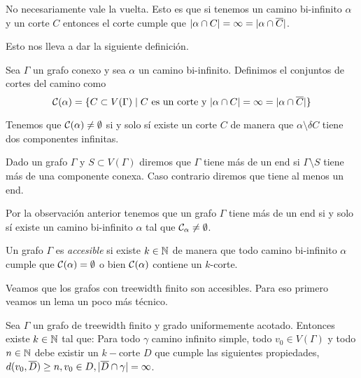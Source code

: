 \documentclass[tesis.tex]{subfiles}
\begin{document}
No necesariamente vale la vuelta.
Esto es que si tenemos un camino bi-infinito $\alpha$ y un corte $C$ entonces el corte cumple que $|\alpha \cap C| = \infty = |\alpha \cap \overline C|$.

Esto nos lleva a dar la siguiente definición.

\begin{deff}
	Sea $\Gamma$ un grafo conexo y sea $\alpha$ un camino bi-infinito.
	Definimos el conjuntos de cortes del camino como 
	\[
		{\cal C}(\alpha) = \{ C \subset V(\Gamma) \mid  C \ \text{es un corte y} \ |\alpha \cap C| = \infty = |\alpha \cap \overline C| \}
	\] 
\end{deff}

\begin{obs}
Tenemos que ${\cal C}(\alpha) \neq \emptyset$ si y solo sí existe un corte $C$ de manera que $\alpha \setminus \delta C$ tiene dos componentes infinitas.
\end{obs}
	
\begin{deff}
	Dado un grafo $\Gamma$ y $S \subset V(\Gamma)$ diremos que $\Gamma$ tiene más de un end si $\Gamma \setminus S$ tiene más de una componente conexa.
	Caso contrario diremos que tiene al menos un end.
\end{deff}

\begin{obs}
	Por la observación anterior tenemos que un grafo $\Gamma$ tiene más de un end si y solo sí existe un camino bi-infinito $\alpha$ tal que ${\cal C}_{\alpha} \neq \emptyset$.
\end{obs}


\begin{deff}
	Un grafo $\Gamma$ es \emph{accesible} si existe $k \in \mathbb{N}$ de manera que todo camino bi-infinito $\alpha$ cumple que ${\cal C}(\alpha) = \emptyset$ o bien ${\cal C}(\alpha)$ contiene un $k$-corte.
\end{deff}

Veamos que los grafos con treewidth finito son accesibles.
Para eso primero veamos un lema un poco más técnico.

\begin{lema}\label{lema_corte_treewidth}
	Sea $\Gamma$ un grafo de treewidth finito y grado uniformemente acotado.
	Entonces existe $k \in \mathbb{N}$ tal que:
	Para todo $\gamma$ camino infinito simple, todo $v_0 \in V(\Gamma)$ y todo $n \in \mathbb{N}$ debe existir un $k-$corte $D$ que cumple las siguientes propiedades, $d(v_0,\overline D) \ge n, v_0 \in D, |\overline D \cap \gamma| = \infty$. 
\end{lema}
\end{document}
